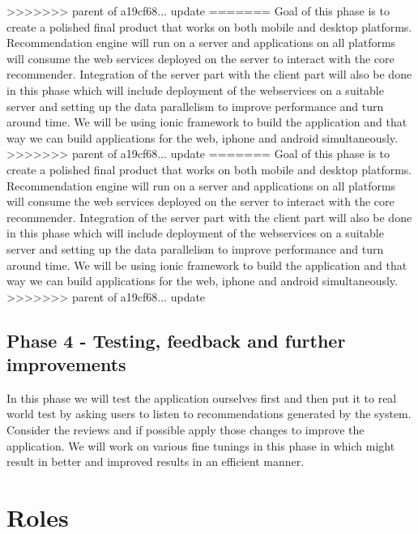 \documentclass{article}
\begin{document}
>>>>>>> parent of a19cf68... update
=======
Goal of this phase is to create a polished final product that works on both mobile and desktop platforms. Recommendation engine will run on a server and applications on all platforms will consume the web services deployed on the server to interact with the core recommender. Integration of the server part with the client part will also be done in this phase which will include deployment of the webservices on a suitable server and setting up the data parallelism to improve performance and turn around time. We will be using ionic framework to build the application and that way we can build applications for the web, iphone and android simultaneously. 
>>>>>>> parent of a19cf68... update
=======
Goal of this phase is to create a polished final product that works on both mobile and desktop platforms. Recommendation engine will run on a server and applications on all platforms will consume the web services deployed on the server to interact with the core recommender. Integration of the server part with the client part will also be done in this phase which will include deployment of the webservices on a suitable server and setting up the data parallelism to improve performance and turn around time. We will be using ionic framework to build the application and that way we can build applications for the web, iphone and android simultaneously. 
>>>>>>> parent of a19cf68... update

\subsection{Phase 4 - Testing, feedback and further improvements}
In this phase we will test the application ourselves first and then put it to real world test by asking users to listen to recommendations generated by the system. Consider the reviews and if possible apply those changes to improve the application. We will work on various fine tunings in this phase in which might result in better and improved results in an efficient manner.

\section{Roles}
\end{document}
